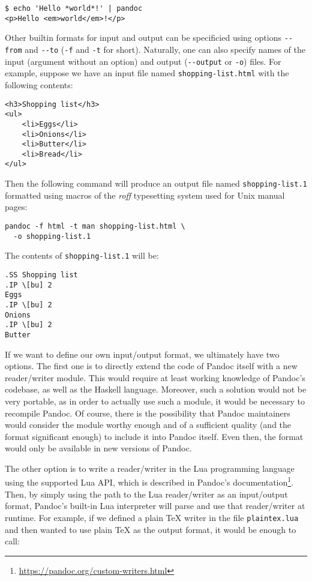 \documentclass[
  digital,     %
  oneside,     %
  nosansbold,  %
  nocolorbold, %
  lof,         %
  nolot,       %
]{fithesis4}
\begin{document}
\noindent
\begin{lstlisting}
$ echo 'Hello *world*!' | pandoc
<p>Hello <em>world</em>!</p>
\end{lstlisting}

\noindent
Other builtin formats for input and output can be specificied using options \texttt{-{}-from} and \texttt{-{}-to} (\texttt{-f} and \texttt{-t} for short). Naturally, one can also specify names of the input (argument without an option) and output (\texttt{-{}-output} or \texttt{-o}) files. For example, suppose we have an input file named \texttt{shopping-list.html} with the following contents:

\noindent
\lstset{language=HTML}
\begin{lstlisting}
<h3>Shopping list</h3>
<ul>
    <li>Eggs</li>
    <li>Onions</li>
    <li>Butter</li>
    <li>Bread</li>
</ul>
\end{lstlisting}

\noindent
Then the following command will produce an output file named \texttt{shopping-list.1} formatted using macros of the \textit{roff} typesetting system used for Unix manual pages:

\noindent
\lstset{language=}
\begin{lstlisting}
pandoc -f html -t man shopping-list.html \
  -o shopping-list.1
\end{lstlisting}

\noindent
The contents of \texttt{shopping-list.1} will be:

\noindent
\begin{lstlisting}
.SS Shopping list
.IP \[bu] 2
Eggs
.IP \[bu] 2
Onions
.IP \[bu] 2
Butter
\end{lstlisting}

\noindent
If we want to define our own input/output format, we ultimately have two options. The first one is to directly extend the code of Pandoc itself with a new reader/writer module. This would require at least working knowledge of Pandoc's codebase, as well as the Haskell language. Moreover, such a solution would not be very portable, as in order to actually use such a module, it would be necessary to recompile Pandoc. Of course, there is the possibility that Pandoc maintainers would consider the module worthy enough and of a sufficient quality (and the format significant enough) to include it into Pandoc itself. Even then, the format would only be available in new versions of Pandoc.

The other option is to write a reader/writer in the Lua programming language using the supported Lua API, which is described in Pandoc's documentation\footnote{\url{https://pandoc.org/custom-writers.html}}. Then, by simply using the path to the Lua reader/writer as an input/output format, Pandoc's built-in Lua interpreter will parse and use that reader/writer at runtime. For example, if we defined a plain \TeX{} writer in the file \texttt{plaintex.lua} and then wanted to use plain \TeX{} as the output format, it would be enough to call:
\end{document}

